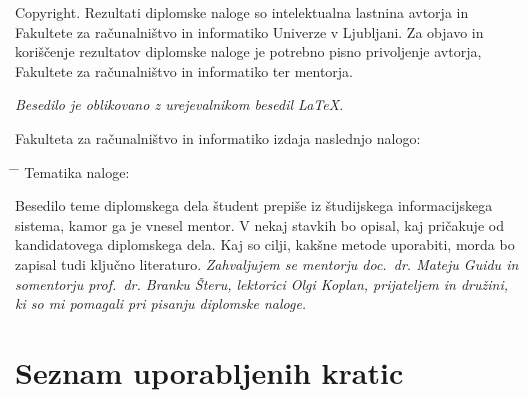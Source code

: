 \documentclass[a4paper, 12pt]{book}
\newcommand{\clearemptydoublepage}{\newpage{\pagestyle{empty}\cleardoublepage}}
\begin{document}
\noindent
{\sc Copyright}. 
Rezultati diplomske naloge so intelektualna lastnina avtorja in Fakultete za računalništvo in informatiko Univerze v Ljubljani.
Za objavo in koriščenje rezultatov diplomske naloge je potrebno pisno privoljenje avtorja, Fakultete za računalništvo in informatiko ter mentorja.

\begin{center}
\mbox{}\vfill
\emph{Besedilo je oblikovano z urejevalnikom besedil \LaTeX.}
\end{center}
\clearemptydoublepage

\thispagestyle{empty}
\vspace*{4cm}

\noindent
Fakulteta za računalništvo in informatiko izdaja naslednjo nalogo:
\medskip
\begin{tabbing}
\hspace{32mm}\= \hspace{6cm} \= \kill
Tematika naloge:
\end{tabbing}
Besedilo teme diplomskega dela študent prepiše iz študijskega informacijskega sistema, kamor ga je vnesel mentor. 
V nekaj stavkih bo opisal, kaj pričakuje od kandidatovega diplomskega dela. Kaj so cilji, kakšne metode uporabiti, morda bo zapisal tudi ključno literaturo.
\vspace{15mm}
\vspace{2cm}
\clearemptydoublepage
\thispagestyle{empty}\mbox{}\vfill\null\it%
\noindent
Zahvaljujem se mentorju doc.\ dr. Mateju Guidu in somentorju prof.\ dr. Branku Šteru, lektorici Olgi Koplan, prijateljem in družini, ki so mi pomagali pri pisanju diplomske naloge.
\rm\normalfont
\clearemptydoublepage
\pagestyle{empty}
\def\thepage{}%
\tableofcontents{}
\clearemptydoublepage


\chapter*{Seznam uporabljenih kratic}  %

\end{document}
